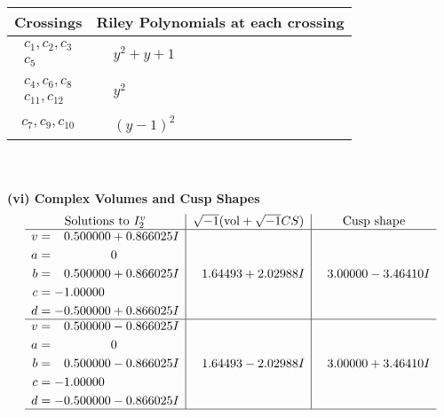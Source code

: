 \documentclass[1p]{elsarticle_modified}
\theoremstyle{definition}
\newcommand{\I}{\sqrt{-1}}
\begin{document}
\begin{tabular}{m{50pt}|m{274pt}}
Crossings & \hspace{64pt}Riley Polynomials at each crossing \\
\hline $$\begin{aligned}c_{1},c_{2},c_{3}\\c_{5}\end{aligned}$$&$\begin{aligned}
&y^2+y+1
\end{aligned}$\\
\hline $$\begin{aligned}c_{4},c_{6},c_{8}\\c_{11},c_{12}\end{aligned}$$&$\begin{aligned}
&y^2
\end{aligned}$\\
\hline $$\begin{aligned}c_{7},c_{9},c_{10}\end{aligned}$$&$\begin{aligned}
&(y-1)^2
\end{aligned}$\\
\hline
\end{tabular}\\~\\
\newpage\flushleft \textbf{(vi) Complex Volumes and Cusp Shapes}
$$\begin{array}{c|c|c}  
\text{Solutions to }I^v_{2}& \I (\text{vol} + \sqrt{-1}CS) & \text{Cusp shape}\\
 \hline 
\begin{aligned}
v &= \phantom{-}0.500000 + 0.866025 I \\
a &= \phantom{-0.000000 } 0 \\
b &= \phantom{-}0.500000 + 0.866025 I \\
c &= -1.00000\phantom{ +0.000000I} \\
d &= -0.500000 + 0.866025 I\end{aligned}
 & \phantom{-}1.64493 + 2.02988 I & \phantom{-}3.00000 - 3.46410 I \\ \hline\begin{aligned}
v &= \phantom{-}0.500000 - 0.866025 I \\
a &= \phantom{-0.000000 } 0 \\
b &= \phantom{-}0.500000 - 0.866025 I \\
c &= -1.00000\phantom{ +0.000000I} \\
d &= -0.500000 - 0.866025 I\end{aligned}
 & \phantom{-}1.64493 - 2.02988 I & \phantom{-}3.00000 + 3.46410 I\\
 \hline 
 \end{array}$$\newpage\newpage\renewcommand{\arraystretch}{1}
\end{document}
